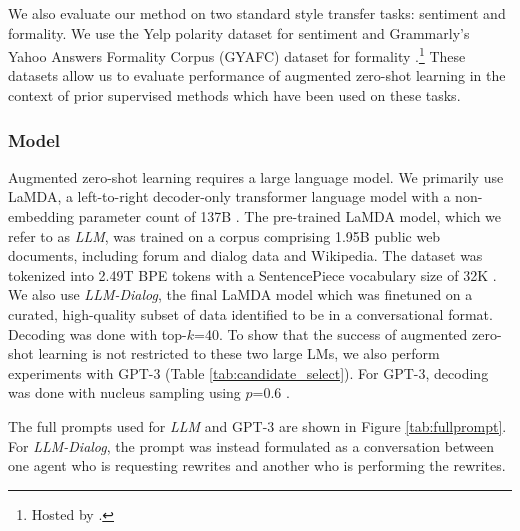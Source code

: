 We also evaluate our method on two standard style transfer tasks: sentiment and formality.
We use the Yelp polarity dataset \citep{zhangCharacterlevelConvolutionalNetworks2015} for sentiment and Grammarly's Yahoo Answers Formality Corpus (GYAFC) dataset for formality \citep{rao-tetreault-2018-dear}.\footnote{Hosted by \citet{DBLP:conf/ijcai/LuoLZYCSS19}.}
These datasets allow us to evaluate performance of augmented zero-shot learning in the context of prior supervised methods which have been used on these tasks.

\subsubsection{Model}
\label{subsection:lambda_description}
Augmented zero-shot learning requires a large language model.
We primarily use LaMDA, a left-to-right decoder-only transformer language model \citep{DBLP:journals/corr/VaswaniSPUJGKP17} with a non-embedding parameter count of 137B \citep{thoppilan2022lamda}. 
The pre-trained LaMDA model, which we refer to as \textit{LLM}, was trained on a corpus comprising 1.95B public web documents, including forum and dialog data and Wikipedia.
The dataset was tokenized into 2.49T BPE tokens with a SentencePiece vocabulary size of 32K \citep{DBLP:journals/corr/abs-1808-06226}.
We also use \textit{LLM-Dialog}, the final LaMDA model which was finetuned on a curated, high-quality subset of data identified to be in a conversational format.
Decoding was done with top-$k$=40.
To show that the success of augmented zero-shot learning is not restricted to these two large LMs, we also perform experiments with GPT-3 (Table \ref{tab:candidate_select}).
For GPT-3, decoding was done with nucleus sampling using $p$=0.6 \citep{holtzman2019curious}.

The full prompts used for \textit{LLM} and GPT-3 are shown in Figure \ref{tab:fullprompt}.
For \textit{LLM-Dialog}, the prompt was instead formulated as a conversation between one agent who is requesting rewrites and another who is performing the rewrites.


